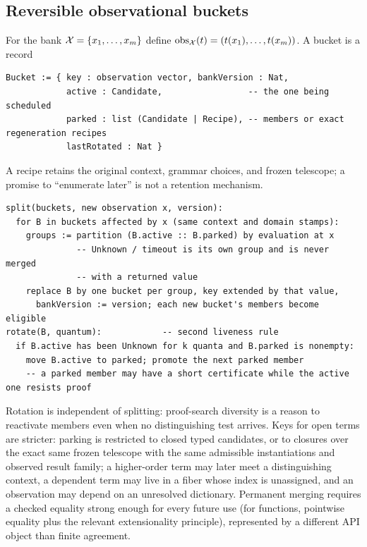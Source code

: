 \subsection{Reversible observational buckets}

\begin{definition}[Bucket]
For the bank $\mathcal{X}=\{x_1,\ldots,x_m\}$ define $\mathrm{obs}_{\mathcal{X}}(t)=(t(x_1),\ldots,t(x_m))$. A bucket is a record
\begin{lstlisting}
Bucket := { key : observation vector, bankVersion : Nat,
            active : Candidate,                 -- the one being scheduled
            parked : list (Candidate | Recipe), -- members or exact regeneration recipes
            lastRotated : Nat }
\end{lstlisting}
A recipe retains the original context, grammar choices, and frozen telescope; a promise to ``enumerate later'' is not a retention mechanism.
\end{definition}

\begin{lstlisting}
split(buckets, new observation x, version):
  for B in buckets affected by x (same context and domain stamps):
    groups := partition (B.active :: B.parked) by evaluation at x
              -- Unknown / timeout is its own group and is never merged
              -- with a returned value
    replace B by one bucket per group, key extended by that value,
      bankVersion := version; each new bucket's members become eligible
rotate(B, quantum):            -- second liveness rule
  if B.active has been Unknown for k quanta and B.parked is nonempty:
    move B.active to parked; promote the next parked member
    -- a parked member may have a short certificate while the active one resists proof
\end{lstlisting}
Rotation is independent of splitting: proof-search diversity is a reason to reactivate members even when no distinguishing test arrives. Keys for open terms are stricter: parking is restricted to closed typed candidates, or to closures over the exact same frozen telescope with the same admissible instantiations and observed result family; a higher-order term may later meet a distinguishing context, a dependent term may live in a fiber whose index is unassigned, and an observation may depend on an unresolved dictionary. Permanent merging requires a checked equality strong enough for every future use (for functions, pointwise equality plus the relevant extensionality principle), represented by a different API object than finite agreement.

